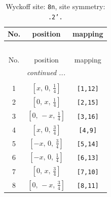 \documentclass[fleqn,8pt]{jsarticle}
\begin{document}
\begin{longtable}{ccc}
\caption{Wyckoff site: {\tt 8n}, site symmetry: {\tt .2'.}}
 \\
 \hline \hline
No. & position & mapping \\ \hline \endfirsthead

\multicolumn{2}{l}{\tablename\ \thetable{}} \\
 \hline \hline
No. & position & mapping \\ \hline \endhead

 \hline \hline
\multicolumn{2}{r}{\footnotesize\it continued ...} \\ \endfoot

 \hline \hline
\multicolumn{2}{r}{} \\ \endlastfoot

1 & $\left[ x,\, 0,\, \frac{1}{4} \right]$ & {\tt [1,12]} \\ \hline
2 & $\left[ 0,\, x,\, \frac{1}{4} \right]$ & {\tt [2,15]} \\ \hline
3 & $\left[ 0,\, - x,\, \frac{1}{4} \right]$ & {\tt [3,16]} \\ \hline
4 & $\left[ x,\, 0,\, \frac{3}{4} \right]$ & {\tt [4,9]} \\ \hline
5 & $\left[ - x,\, 0,\, \frac{3}{4} \right]$ & {\tt [5,14]} \\ \hline
6 & $\left[ - x,\, 0,\, \frac{1}{4} \right]$ & {\tt [6,13]} \\ \hline
7 & $\left[ 0,\, x,\, \frac{3}{4} \right]$ & {\tt [7,10]} \\ \hline
8 & $\left[ 0,\, - x,\, \frac{3}{4} \right]$ & {\tt [8,11]} \\
\end{longtable}
\renewcommand{\arraystretch}{1.2}
\end{document}
